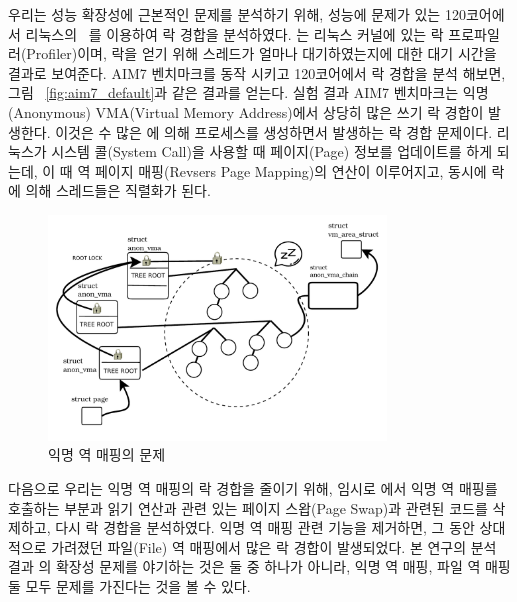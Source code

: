 우리는 성능 확장성에 근본적인 문제를 분석하기 위해, 성능에 문제가 있는 120코어에서 리눅스의
~\cite{LOCKSTAT}를 이용하여 락 경합을 분석하였다.
는 리눅스 커널에 있는 락 프로파일러(Profiler)이며, 
락을 얻기 위해 스레드가 얼마나 대기하였는지에 대한 대기 시간을 결과로 보여준다.
AIM7 벤치마크를 동작 시키고 120코어에서 락 경합을 분석 해보면, 
그림 ~\ref{fig:aim7_default}과 같은 결과를 얻는다.
실험 결과 AIM7 벤치마크는 익명(Anonymous) VMA(Virtual Memory Address)에서 상당히 많은 쓰기 락 경합이
발생한다.
이것은 수 많은 에 의해 프로세스를 생성하면서 발생하는 락 경합 문제이다.
리눅스가 시스템 콜(System Call)을 사용할 때 페이지(Page) 정보를
업데이트를 하게 되는데, 이 때 역 페이지 매핑(Revsers Page Mapping)의 연산이 이루어지고, 
동시에 락에 의해 스레드들은 직렬화가 된다. 

 \begin{figure}[h]
    \centering
    \includegraphics[width=0.8\textwidth]{fig/anon_vma_rmap}
    \caption{익명 역 매핑의 문제}
  \label{fig:anon_vma_rmap}
\end{figure}

다음으로 우리는 익명 역 매핑의 락 경합을 줄이기 위해, 임시로 에서 익명 역 매핑를 호출하는 부분과 
읽기 연산과 관련 있는 페이지 스왑(Page Swap)과 관련된 코드를 삭제하고, 다시 락 경합을 분석하였다. 
익명 역 매핑 관련 기능을 제거하면, 그 동안 상대적으로 가려졌던 파일(File) 역 매핑에서 많은 락 경합이 발생되었다.
본 연구의 분석 결과 의 확장성 문제를 야기하는 것은 둘 중 하나가 아니라, 익명 역 매핑, 
파일 역 매핑 둘 모두 문제를 가진다는 것을 볼 수 있다.

